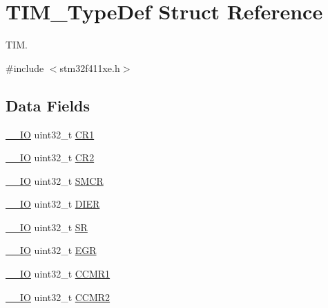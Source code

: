 \hypertarget{struct_t_i_m___type_def}{}\section{T\+I\+M\+\_\+\+Type\+Def Struct Reference}
\label{struct_t_i_m___type_def}


T\+IM.  




{\ttfamily \#include $<$stm32f411xe.\+h$>$}

\subsection*{Data Fields}
\begin{DoxyCompactItemize}
\item 
\hyperlink{core__sc300_8h_aec43007d9998a0a0e01faede4133d6be}{\+\_\+\+\_\+\+IO} uint32\+\_\+t \hyperlink{struct_t_i_m___type_def_a9dafc8b03e8497203a8bb395db865328}{C\+R1}
\item 
\hyperlink{core__sc300_8h_aec43007d9998a0a0e01faede4133d6be}{\+\_\+\+\_\+\+IO} uint32\+\_\+t \hyperlink{struct_t_i_m___type_def_a6b1ae85138ed91686bf63699c61ef835}{C\+R2}
\item 
\hyperlink{core__sc300_8h_aec43007d9998a0a0e01faede4133d6be}{\+\_\+\+\_\+\+IO} uint32\+\_\+t \hyperlink{struct_t_i_m___type_def_a67d30593bcb68b98186ebe5bc8dc34b1}{S\+M\+CR}
\item 
\hyperlink{core__sc300_8h_aec43007d9998a0a0e01faede4133d6be}{\+\_\+\+\_\+\+IO} uint32\+\_\+t \hyperlink{struct_t_i_m___type_def_a22a33c78ca5bec0e3e8559164a82b8ef}{D\+I\+ER}
\item 
\hyperlink{core__sc300_8h_aec43007d9998a0a0e01faede4133d6be}{\+\_\+\+\_\+\+IO} uint32\+\_\+t \hyperlink{struct_t_i_m___type_def_acedfc978c879835c05ef1788ad26b2ff}{SR}
\item 
\hyperlink{core__sc300_8h_aec43007d9998a0a0e01faede4133d6be}{\+\_\+\+\_\+\+IO} uint32\+\_\+t \hyperlink{struct_t_i_m___type_def_a04248d87f48303fd2267810104a7878d}{E\+GR}
\item 
\hyperlink{core__sc300_8h_aec43007d9998a0a0e01faede4133d6be}{\+\_\+\+\_\+\+IO} uint32\+\_\+t \hyperlink{struct_t_i_m___type_def_a0f2291e7efdf3222689ef13e9be2ea4a}{C\+C\+M\+R1}
\item 
\hyperlink{core__sc300_8h_aec43007d9998a0a0e01faede4133d6be}{\+\_\+\+\_\+\+IO} uint32\+\_\+t \hyperlink{struct_t_i_m___type_def_aa8129ca70a2232c91c8cfcaf375249f6}{C\+C\+M\+R2}
\item 

\end{DoxyCompactItemize}
